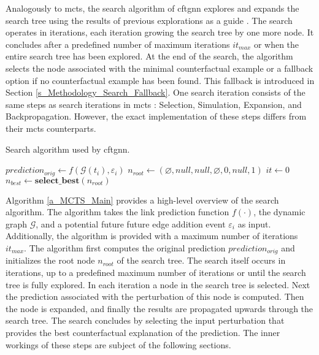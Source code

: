 Analogously to \gls{mcts}, the search algorithm of \gls{cftgnn} explores and expands the search tree using the results of previous explorations as a guide \cite{browne_survey_2012}. The search operates in iterations, each iteration growing the search tree by one more node. It concludes after a predefined number of maximum iterations $it_{max}$ or when the entire search tree has been explored. At the end of the search, the algorithm selects the node associated with the minimal counterfactual example or a fallback option if no counterfactual example has been found. This fallback is introduced in Section \ref{s_Methodology_Search_Fallback}. One search iteration consists of the same steps as search iterations in \gls{mcts} \cite{browne_survey_2012}: Selection, Simulation, Expansion, and Backpropagation. However, the exact implementation of these steps differs from their \gls{mcts} counterparts.

{
\setlength{\algomargin}{1.25em}
\small
\begin{algorithm}[ht]
\caption{Search algorithm used by \gls{cftgnn}.}
\label{a_MCTS_Main}
    $prediction_{orig} \gets f(\mathcal{G}(t_i), \varepsilon_i)$\;
    $n_{root} \gets (\varnothing, null, null, \varnothing, 0, null, 1)$\;
    $it \gets 0$\;
    $n_{best} \gets \mathrm{\textbf{select\_best}}(n_{root})$\;
\end{algorithm}
}

Algorithm \ref{a_MCTS_Main} provides a high-level overview of the search algorithm. The algorithm takes the link prediction function $f(\cdot)$, the dynamic graph $\mathcal{G}$, and a potential future future edge addition event $\varepsilon_i$ as input. Additionally, the algorithm is provided with a maximum number of iterations $it_{max}$. The algorithm first computes the original prediction $prediction_{orig}$ and initializes the root node $n_{root}$ of the search tree. The search itself occurs in iterations, up to a predefined maximum number of iterations or until the search tree is fully explored. In each iteration a node in the search tree is selected. Next the prediction associated with the perturbation of this node is computed. Then the node is expanded, and finally the results are propagated upwards through the search tree. The search concludes by selecting the input perturbation that provides the best counterfactual explanation of the prediction. The inner workings of these steps are subject of the following sections.


